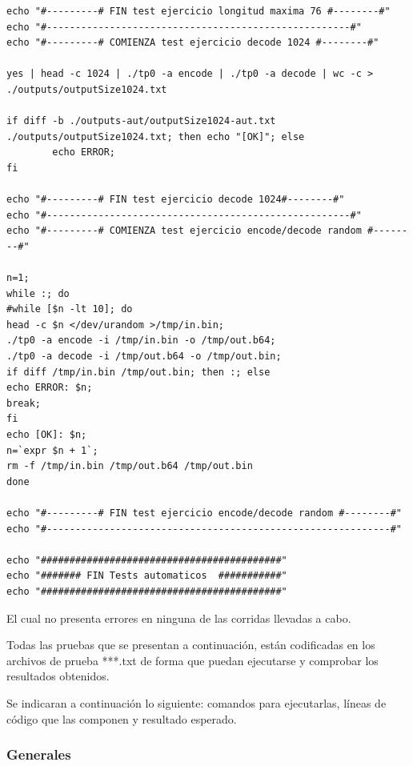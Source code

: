 \documentclass[10pt,a4paper]{article}
\begin{document}
\begin{lstlisting}
echo "#---------# FIN test ejercicio longitud maxima 76 #--------#"
echo "#-----------------------------------------------------#"
echo "#---------# COMIENZA test ejercicio decode 1024 #--------#"

yes | head -c 1024 | ./tp0 -a encode | ./tp0 -a decode | wc -c > ./outputs/outputSize1024.txt

if diff -b ./outputs-aut/outputSize1024-aut.txt ./outputs/outputSize1024.txt; then echo "[OK]"; else
		echo ERROR;
fi

echo "#---------# FIN test ejercicio decode 1024#--------#"
echo "#-----------------------------------------------------#"
echo "#---------# COMIENZA test ejercicio encode/decode random #--------#"

n=1;
while :; do
#while [$n -lt 10]; do
head -c $n </dev/urandom >/tmp/in.bin;
./tp0 -a encode -i /tmp/in.bin -o /tmp/out.b64;
./tp0 -a decode -i /tmp/out.b64 -o /tmp/out.bin;
if diff /tmp/in.bin /tmp/out.bin; then :; else
echo ERROR: $n;
break;
fi
echo [OK]: $n;
n=`expr $n + 1`;
rm -f /tmp/in.bin /tmp/out.b64 /tmp/out.bin
done

echo "#---------# FIN test ejercicio encode/decode random #--------#"
echo "#------------------------------------------------------------#"

echo "##########################################"
echo "####### FIN Tests automaticos  ###########"
echo "##########################################"

\end{lstlisting}

El cual no presenta errores en ninguna de las corridas llevadas a cabo.


Todas las pruebas que se presentan a continuación, están codificadas en los archivos de prueba ***.txt de forma que puedan ejecutarse y comprobar los resultados obtenidos.

Se indicaran a continuación lo siguiente: comandos para ejecutarlas, líneas de código que las componen y resultado esperado.


\subsubsection{Generales}
\end{document}

